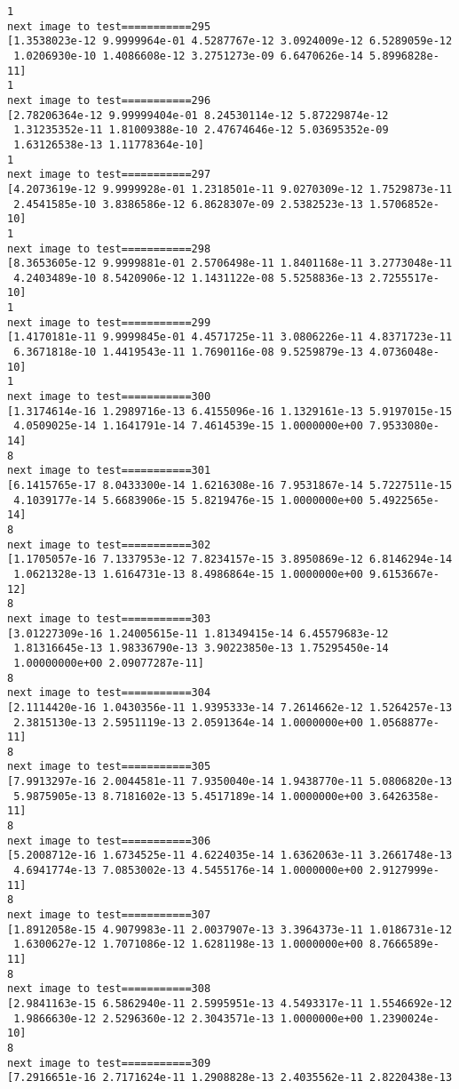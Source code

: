 \documentclass[11pt]{article}
\begin{document}
\begin{Verbatim}[commandchars=\\\{\}]
1
next image to test===========295
[1.3538023e-12 9.9999964e-01 4.5287767e-12 3.0924009e-12 6.5289059e-12
 1.0206930e-10 1.4086608e-12 3.2751273e-09 6.6470626e-14 5.8996828e-11]
1
next image to test===========296
[2.78206364e-12 9.99999404e-01 8.24530114e-12 5.87229874e-12
 1.31235352e-11 1.81009388e-10 2.47674646e-12 5.03695352e-09
 1.63126538e-13 1.11778364e-10]
1
next image to test===========297
[4.2073619e-12 9.9999928e-01 1.2318501e-11 9.0270309e-12 1.7529873e-11
 2.4541585e-10 3.8386586e-12 6.8628307e-09 2.5382523e-13 1.5706852e-10]
1
next image to test===========298
[8.3653605e-12 9.9999881e-01 2.5706498e-11 1.8401168e-11 3.2773048e-11
 4.2403489e-10 8.5420906e-12 1.1431122e-08 5.5258836e-13 2.7255517e-10]
1
next image to test===========299
[1.4170181e-11 9.9999845e-01 4.4571725e-11 3.0806226e-11 4.8371723e-11
 6.3671818e-10 1.4419543e-11 1.7690116e-08 9.5259879e-13 4.0736048e-10]
1
next image to test===========300
[1.3174614e-16 1.2989716e-13 6.4155096e-16 1.1329161e-13 5.9197015e-15
 4.0509025e-14 1.1641791e-14 7.4614539e-15 1.0000000e+00 7.9533080e-14]
8
next image to test===========301
[6.1415765e-17 8.0433300e-14 1.6216308e-16 7.9531867e-14 5.7227511e-15
 4.1039177e-14 5.6683906e-15 5.8219476e-15 1.0000000e+00 5.4922565e-14]
8
next image to test===========302
[1.1705057e-16 7.1337953e-12 7.8234157e-15 3.8950869e-12 6.8146294e-14
 1.0621328e-13 1.6164731e-13 8.4986864e-15 1.0000000e+00 9.6153667e-12]
8
next image to test===========303
[3.01227309e-16 1.24005615e-11 1.81349415e-14 6.45579683e-12
 1.81316645e-13 1.98336790e-13 3.90223850e-13 1.75295450e-14
 1.00000000e+00 2.09077287e-11]
8
next image to test===========304
[2.1114420e-16 1.0430356e-11 1.9395333e-14 7.2614662e-12 1.5264257e-13
 2.3815130e-13 2.5951119e-13 2.0591364e-14 1.0000000e+00 1.0568877e-11]
8
next image to test===========305
[7.9913297e-16 2.0044581e-11 7.9350040e-14 1.9438770e-11 5.0806820e-13
 5.9875905e-13 8.7181602e-13 5.4517189e-14 1.0000000e+00 3.6426358e-11]
8
next image to test===========306
[5.2008712e-16 1.6734525e-11 4.6224035e-14 1.6362063e-11 3.2661748e-13
 4.6941774e-13 7.0853002e-13 4.5455176e-14 1.0000000e+00 2.9127999e-11]
8
next image to test===========307
[1.8912058e-15 4.9079983e-11 2.0037907e-13 3.3964373e-11 1.0186731e-12
 1.6300627e-12 1.7071086e-12 1.6281198e-13 1.0000000e+00 8.7666589e-11]
8
next image to test===========308
[2.9841163e-15 6.5862940e-11 2.5995951e-13 4.5493317e-11 1.5546692e-12
 1.9866630e-12 2.5296360e-12 2.3043571e-13 1.0000000e+00 1.2390024e-10]
8
next image to test===========309
[7.2916651e-16 2.7171624e-11 1.2908828e-13 2.4035562e-11 2.8220438e-13

\end{Verbatim}
\end{document}
